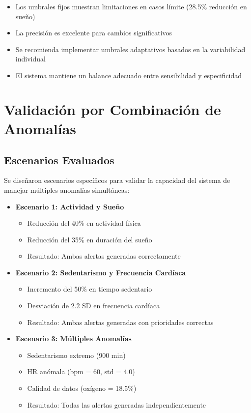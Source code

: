 \begin{itemize}
    \item Los umbrales fijos muestran limitaciones en casos límite (28.5\% reducción en sueño)
    \item La precisión es excelente para cambios significativos
    \item Se recomienda implementar umbrales adaptativos basados en la variabilidad individual
    \item El sistema mantiene un balance adecuado entre sensibilidad y especificidad
\end{itemize}

\section{Validación por Combinación de Anomalías}
\label{anexo:pruebas:combinadas}

\subsection{Escenarios Evaluados}

Se diseñaron escenarios específicos para validar la capacidad del sistema de manejar múltiples anomalías simultáneas:

\begin{itemize}
    \item \textbf{Escenario 1: Actividad y Sueño}
    \begin{itemize}
        \item Reducción del 40\% en actividad física
        \item Reducción del 35\% en duración del sueño
        \item Resultado: Ambas alertas generadas correctamente
    \end{itemize}
    
    \item \textbf{Escenario 2: Sedentarismo y Frecuencia Cardíaca}
    \begin{itemize}
        \item Incremento del 50\% en tiempo sedentario
        \item Desviación de 2.2 SD en frecuencia cardíaca
        \item Resultado: Ambas alertas generadas con prioridades correctas
    \end{itemize}
    
    \item \textbf{Escenario 3: Múltiples Anomalías}
    \begin{itemize}
        \item Sedentarismo extremo (900 min)
        \item HR anómala (bpm = 60, std = 4.0)
        \item Calidad de datos (oxígeno = 18.5\%)
        \item Resultado: Todas las alertas generadas independientemente
    \end{itemize}
\end{itemize}


